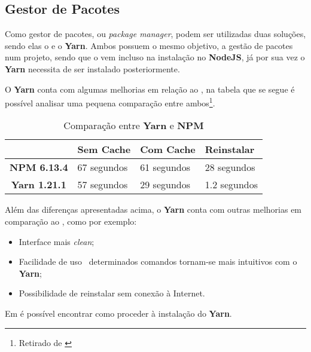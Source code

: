 \subsection{Gestor de Pacotes}

Como gestor de pacotes, ou \textit{package manager}, podem ser utilizadas duas soluções, sendo elas o \textbf{} e o \textbf{Yarn}. Ambos possuem o mesmo objetivo, a gestão de pacotes num projeto, sendo que o \textbf{} vem incluso na instalação no \textbf{NodeJS}, já por sua vez o \textbf{Yarn} necessita de ser instalado posteriormente.

O \textbf{Yarn} conta com algumas melhorias em relação ao \textbf{}, na tabela que se segue é possível analisar uma pequena comparação entre ambos\footnote{Retirado de \cite{yarnVSNpm}}.

\begin{table}[h!]
	\renewcommand{\arraystretch}{1.25}
	\centering
	\begin{tabularx}{.85\textwidth}{ |c X X X| }
		\rowcolor{estg} & {\color[HTML]{FFFFFF} \textbf{Sem Cache}} & 	{\color[HTML]{FFFFFF} \textbf{Com Cache}} & {\color[HTML]{FFFFFF} \textbf{Reinstalar}} \\\hline


		\textbf{NPM 6.13.4} & 67 segundos & 61 segundos & 28 segundos \\\hline
		\textbf{Yarn 1.21.1} & 57 segundos & 29 segundos & 1.2 segundos \\\hline
	\end{tabularx}

	\caption{Comparação entre \textbf{Yarn} e \textbf{NPM}}
\end{table}

Além das diferenças apresentadas acima, o \textbf{Yarn} conta com outras melhorias em comparação ao \textbf{}, como por exemplo:

\begin{itemize}
	\item Interface mais \textit{clean};
	\item Facilidade de uso \textemdash ~determinados comandos tornam-se mais intuitivos com o \textbf{Yarn};
	\item Possibilidade de reinstalar  sem conexão à Internet.
\end{itemize}


Em  é possível encontrar como proceder à instalação do \textbf{Yarn}.